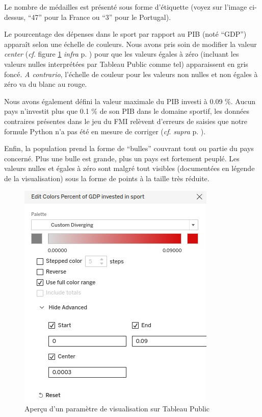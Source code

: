 \documentclass[hidelinks, 12pt]{report}
\begin{document}
Le nombre de médailles est présenté sous forme d'étiquette (voyez sur l'image ci-dessus, \enquote{47} pour la France ou \enquote{3} pour le Portugal).

\label{color}Le pourcentage des dépenses dans le sport par rapport au PIB (noté \enquote{GDP}) apparaît selon une échelle de couleurs. Nous avons pris soin de modifier la valeur \textit{center} (\textit{cf}. figure \ref{param} \textit{infra} p. \pageref{param}) pour que les valeurs égales à zéro (incluant les valeurs nulles interprétées par Tableau Public comme tel) apparaissent en gris foncé. \textit{A contrario}, l'échelle de couleur pour les valeurs non nulles et non égales à zéro va du blanc au rouge. 

Nous avons également défini la valeur maximale du PIB investi à 0.09 \%. Aucun pays n'investit plus que 0.1 \% de son PIB dans le domaine sportif, les données contraires présentes dans le jeu du FMI relèvent d'erreurs de saisies que notre formule Python n'a pas été en mesure de corriger (\textit{cf}. \textit{supra} p. \pageref{python}). 

Enfin, la population prend la forme de \enquote{bulles} couvrant tout ou partie du pays concerné. Plus une bulle est grande, plus un pays est fortement peuplé. Les valeurs nulles et égales à zéro sont malgré tout visibles (documentées en légende de la visualisation) sous la forme de points à la taille très réduite.

\begin{center}
	\begin{figure}[H]
		\centering
		\setlength{\belowcaptionskip}{-35pt}
		\includegraphics[scale=0.5]{images/datavis-medals-world-center.png}
		\caption{Aperçu d'un paramètre de visualisation sur Tableau Public}
		\label{param}
	\end{figure}
\end{center}
\end{document}
